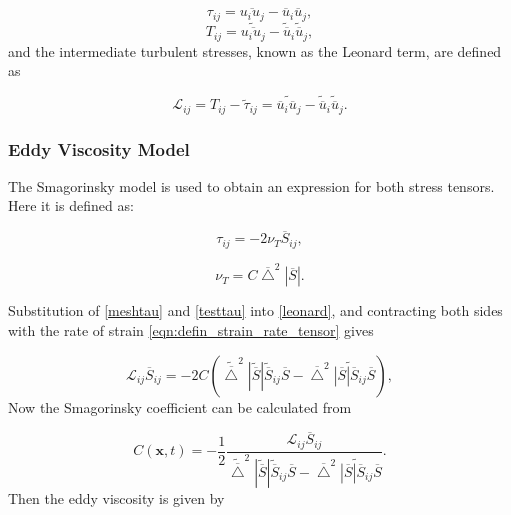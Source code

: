 \begin{equation}\label{meshtau}
\tau_{ij} = \overline{u_i u_j} - \overline u_i \overline u_j,
\end{equation}
\begin{equation}\label{testtau}
T_{ij} = \widetilde{\overline{u_i u_j}} - \widetilde{\overline u}_i \widetilde{\overline u}_j,
\end{equation}
and the intermediate turbulent stresses, known as the Leonard term, are defined as

\begin{equation}\label{leonard}
\mathcal L_{ij} = T_{ij} - \widetilde{\tau}_{ij} = \widetilde{\overline u_i \overline u_j} - \widetilde{\overline u}_i \widetilde{\overline u}_j.
\end{equation}

\subsubsection{Eddy Viscosity Model}

The Smagorinsky model is used to obtain an expression for both stress tensors. Here it is defined as:

\begin{equation}\label{smagtau}
\tau_{ij} = -2 \nu_T \overline S_{ij},
\end{equation}

\begin{equation}\label{smagnut}
\nu_T = C \overline \bigtriangleup^2 \left | \overline S \right |.
\end{equation}

Substitution of \eqref{meshtau} and \eqref{testtau} into \eqref{leonard}, and contracting both sides with the rate of strain \eqref{eqn:defin_strain_rate_tensor} gives

\begin{equation}
\mathcal L_{ij} \overline S_{ij} = -2C(\widetilde{\overline \bigtriangleup}^2 | \widetilde{\overline S} | \widetilde{\overline S}_{ij} \overline S -
\overline \bigtriangleup^2 \widetilde{ | \overline S | \overline S_{ij}} \overline S),
\end{equation}
Now the Smagorinsky coefficient can be calculated from

\begin{equation}\label{germanocoeff}
C(\mathbf x, t) = - \frac{1}{2} \frac{\mathcal L_{ij} \overline S_{ij}}
{\widetilde{\overline \bigtriangleup}^2 | \widetilde{\overline S} | \widetilde{\overline S}_{ij} \overline S -
\overline \bigtriangleup^2 \widetilde{ | \overline S | \overline S_{ij}} \overline S}.
\end{equation}
Then the eddy viscosity is given by

